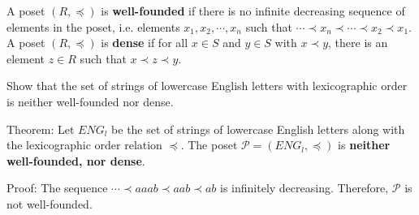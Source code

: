 \documentclass[addpoints]{exam}
\begin{document}
\begin{questions}
\begin{solution}
  \end{solution}
  
\question 
A poset $(R, \preccurlyeq)$ is \textbf{well-founded} if there is no infinite decreasing sequence of elements in the poset, i.e. elements $x_1, x_2, \cdots, x_n$ such that $\cdots \prec x_n \prec \cdots  \prec x_2 \prec x_1$. A poset $(R, \preccurlyeq)$ is \textbf{dense} if for all $x \in S$ and $y \in S$ with $x \prec y$, there is an element $z \in R$ such that $x \prec z \prec y$.

Show that the set of strings of lowercase English letters with lexicographic order is neither well-founded nor dense.


  \begin{solution}
    
    Theorem: Let $ENG_l$ be the set of strings of lowercase English letters along with the lexicographic order relation $\preccurlyeq$. The poset $\mathcal{P} = (ENG_l,\preccurlyeq)$ is \textbf{neither well-founded, nor dense}.
    
    Proof: The sequence $\cdots \prec aaab \prec aab \prec ab$ is infinitely decreasing. Therefore, $\mathcal{P}$ is not well-founded. 
    

\end{solution}
\end{questions}
\end{document}

